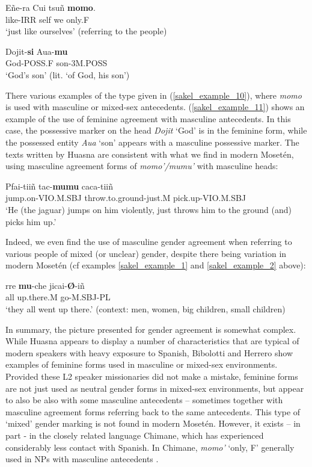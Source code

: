\documentclass[output=paper,colorlinks,citecolor=brown
]{langscibook}
\begin{document}
\ea \label{sakel_example_10}
\gll Eñe-ra 	Cui 	tsuñ 	\textbf{momo}.\\
     like-IRR	self	we	only.F\\
\glt ‘just like ourselves’ (referring to the people)
\z

\ea \label{sakel_example_11}
\gll Dojit-\textbf{si} 	Aua-\textbf{mu}\\
     God-POSS.F	son-3M.POSS\\
\glt ‘God’s son’ (lit. ‘of God, his son’)
\z	

There various examples of the type given in (\ref{sakel_example_10}), where \textit{momo} is used with masculine or mixed-sex antecedents. (\ref{sakel_example_11}) shows an example of the use of feminine agreement with masculine antecedents. In this case, the possessive marker on the head \textit{Dojit} ‘God’ is in the feminine form, while the possessed entity \textit{Aua} ‘son’ appears with a masculine possessive marker.	
The texts written by Huasna are consistent with what we find in modern Mosetén, using masculine agreement forms of \textit{momo’/mumu’} with masculine heads:

 \ea \label{sakel_example_12}
\gll Pfai-tiiñ		tac-\textbf{mumu}			caca-tiiñ\\
     jump.on-VIO.M.SBJ	throw.to.ground-just.M	pick.up-VIO.M.SBJ\\
\glt ‘He (the jaguar) jumps on him violently, just throws him to the ground (and) picks him up.’
\z	

Indeed, we even find the use of masculine gender agreement when referring to various people of mixed (or unclear) gender, despite there being variation in modern Mosetén (cf examples \ref{sakel_example_1} and \ref{sakel_example_2} above):


 \ea \label{sakel_example_13}
\gll rre	\textbf{mu}-che	jicai-\textbf{Ø}-iñ\\
     all	up.there.M	go-M.SBJ-PL\\
\glt ‘they all went up there.’ (context: men, women, big children, small children)
\z	

In summary, the picture presented for gender agreement is somewhat complex. While Huasna appears to display a number of characteristics that are typical of modern speakers with heavy exposure to Spanish, Bibolotti and Herrero show examples of feminine forms used in masculine or mixed-sex environments. 
Provided these L2 speaker missionaries did not make a mistake, feminine forms are not just used as neutral gender forms in mixed-sex environments, but appear to also be also with some masculine antecedents – sometimes together with masculine agreement forms referring back to the same antecedents. This type of ‘mixed’ gender marking is not found in modern Mosetén. However, it exists – in part - in the closely related language Chimane, which has experienced considerably less contact with Spanish. In Chimane, \textit{momo’} ‘only, F’ generally used in NPs with masculine antecedents \citep{gill1999pedagogical}.
\end{document}
